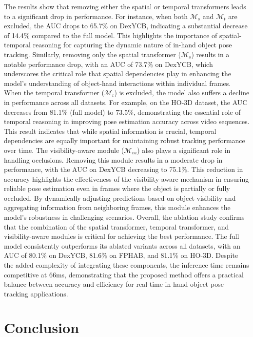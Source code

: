 The results show that removing either the spatial or temporal transformers leads to a significant drop in performance. For instance, when both $\mathcal{M}_{s}$ and $\mathcal{M}_{t}$ are excluded, the AUC drops to 65.7\% on DexYCB, indicating a substantial decrease of 14.4\% compared to the full model. This highlights the importance of spatial-temporal reasoning for capturing the dynamic nature of in-hand object pose tracking. Similarly, removing only the spatial transformer ($\mathcal{M}_{s}$) results in a notable performance drop, with an AUC of 73.7\% on DexYCB, which underscores the critical role that spatial dependencies play in enhancing the model's understanding of object-hand interactions within individual frames. When the temporal transformer ($\mathcal{M}_{t}$) is excluded, the model also suffers a decline in performance across all datasets. For example, on the HO-3D dataset, the AUC decreases from 81.1\% (full model) to 73.5\%, demonstrating the essential role of temporal reasoning in improving pose estimation accuracy across video sequences. This result indicates that while spatial information is crucial, temporal dependencies are equally important for maintaining robust tracking performance over time. The visibility-aware module ($\mathcal{M}_{va}$) also plays a significant role in handling occlusions. Removing this module results in a moderate drop in performance, with the AUC on DexYCB decreasing to 75.1\%. This reduction in accuracy highlights the effectiveness of the visibility-aware mechanism in ensuring reliable pose estimation even in frames where the object is partially or fully occluded. By dynamically adjusting predictions based on object visibility and aggregating information from neighboring frames, this module enhances the model's robustness in challenging scenarios. Overall, the ablation study confirms that the combination of the spatial transformer, temporal transformer, and visibility-aware modules is critical for achieving the best performance. The full model consistently outperforms its ablated variants across all datasets, with an AUC of 80.1\% on DexYCB, 81.6\% on FPHAB, and 81.1\% on HO-3D. Despite the added complexity of integrating these components, the inference time remains competitive at 66ms, demonstrating that the proposed method offers a practical balance between accuracy and efficiency for real-time in-hand object pose tracking applications.

\section{Conclusion}

